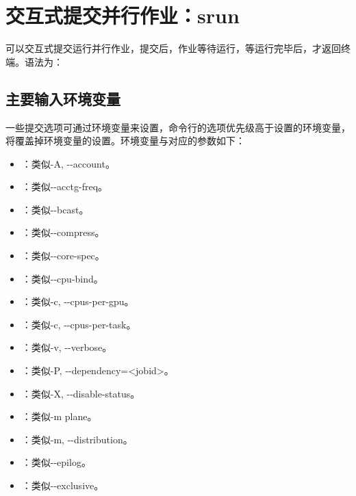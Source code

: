 \section{交互式提交并行作业：srun}
可以交互式提交运行并行作业，提交后，作业等待运行，等运行完毕后，才返回终端。语法为：

\subsection{主要输入环境变量}
一些提交选项可通过环境变量来设置，命令行的选项优先级高于设置的环境变量，将覆盖掉环境变量的设置。环境变量与对应的参数如下：
\begin{itemize}
	\item {}：类似-A, -{}-account。
	\item {}：类似-{}-acctg-freq。
	\item {}：类似-{}-bcast。
	\item {}：类似-{}-compress。
	\item {}：类似-{}-core-spec。
	\item {}：类似-{}-cpu-bind。
	\item {}：类似-c, -{}-cpus-per-gpu。
	\item {}：类似-c, -{}-cpus-per-task。
	\item {}：类似-v, -{}-verbose。
	\item {}：类似-P, -{}-dependency=<jobid>。
	\item {}：类似-X, -{}-disable-status。
	\item {}：类似-m plane。
	\item {}：类似-m, -{}-distribution。
	\item {}：类似-{}-epilog。
	\item {}：类似-{}-exclusive。

\end{itemize}
